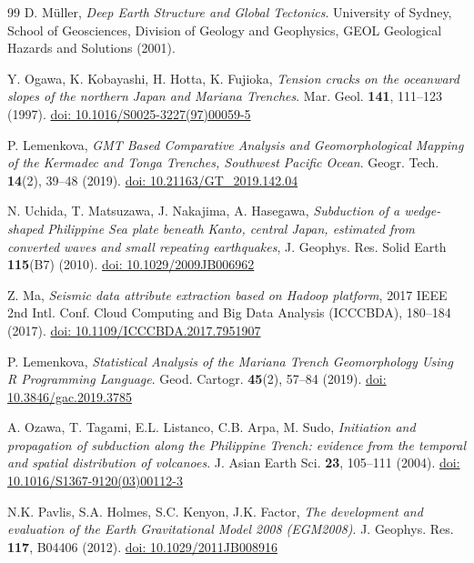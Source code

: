 \documentclass{rrparticle}
\begin{document}
\begin{thebibliography}{99}
 D. Müller, \emph{Deep Earth Structure and Global Tectonics}. University of Sydney, School of Geosciences, Division of Geology and Geophysics, GEOL Geological Hazards and Solutions (2001).

 Y. Ogawa, K. Kobayashi, H. Hotta, K. Fujioka, \emph{Tension cracks on the oceanward slopes of the northern Japan and Mariana Trenches}. Mar. Geol. \textbf{141}, 111--123 (1997). \href{https://doi.org/10.1016/S0025-3227(97)00059-5}{doi: 10.1016/S0025-3227(97)00059-5}

 P. Lemenkova, \emph{GMT Based Comparative Analysis and Geomorphological Mapping of the Kermadec and Tonga Trenches, Southwest Pacific Ocean}. Geogr. Tech. \textbf{14}(2), 39--48 (2019). \href{https://doi.org/10.21163/GT_2019.142.04}{doi: 10.21163/GT\_2019.142.04}

 N. Uchida, T. Matsuzawa, J. Nakajima, A. Hasegawa, \emph{Subduction of a wedge-shaped Philippine Sea plate beneath Kanto, central Japan, estimated from converted waves and small repeating earthquakes}, J. Geophys. Res. Solid Earth \textbf{115}(B7) (2010). \href{https://doi.org/10.1029/2009JB006962}{doi: 10.1029/2009JB006962}

 Z. Ma, \emph{Seismic data attribute extraction based on Hadoop platform}, 2017 IEEE 2nd Intl. Conf. Cloud Computing and Big Data Analysis (ICCCBDA), 180--184 (2017). \href{https://doi.org/10.1109/ICCCBDA.2017.7951907}{doi: 10.1109/ICCCBDA.2017.7951907}

 P. Lemenkova, \emph{Statistical Analysis of the Mariana Trench Geomorphology Using R Programming Language}. Geod. Cartogr. \textbf{45}(2), 57--84 (2019). \href{https://doi.org/10.3846/gac.2019.3785}{doi: 10.3846/gac.2019.3785}

 A. Ozawa, T. Tagami, E.L. Listanco, C.B. Arpa, M. Sudo, \emph{Initiation and propagation of subduction along the Philippine Trench: evidence from the temporal and spatial distribution of volcanoes}. J. Asian Earth Sci. \textbf{23}, 105--111 (2004). \href{https://doi.org/10.1016/S1367-9120(03)00112-3}{doi: 10.1016/S1367-9120(03)00112-3}

 N.K. Pavlis, S.A. Holmes, S.C. Kenyon, J.K. Factor, \emph{The development and evaluation of the Earth Gravitational Model 2008 (EGM2008)}. J. Geophys. Res. \textbf{117}, B04406 (2012). \href{https://doi.org/10.1029/2011JB008916}{doi: 10.1029/2011JB008916}


\end{thebibliography}
\end{document}
